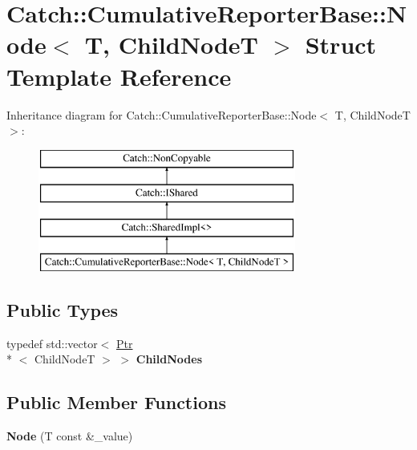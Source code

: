 \hypertarget{struct_catch_1_1_cumulative_reporter_base_1_1_node}{\section{Catch\-:\-:Cumulative\-Reporter\-Base\-:\-:Node$<$ T, Child\-Node\-T $>$ Struct Template Reference}
\label{struct_catch_1_1_cumulative_reporter_base_1_1_node}
}
Inheritance diagram for Catch\-:\-:Cumulative\-Reporter\-Base\-:\-:Node$<$ T, Child\-Node\-T $>$\-:\begin{figure}[H]
\begin{center}
\leavevmode
\includegraphics[height=4.000000cm]{struct_catch_1_1_cumulative_reporter_base_1_1_node}
\end{center}
\end{figure}
\subsection*{Public Types}
\begin{DoxyCompactItemize}
\item 
\hypertarget{struct_catch_1_1_cumulative_reporter_base_1_1_node_ad410701d72466c05acf86956aabafaf1}{typedef std\-::vector$<$ \hyperlink{class_catch_1_1_ptr}{Ptr}\\*
$<$ Child\-Node\-T $>$ $>$ {\bfseries Child\-Nodes}}\label{struct_catch_1_1_cumulative_reporter_base_1_1_node_ad410701d72466c05acf86956aabafaf1}

\end{DoxyCompactItemize}
\subsection*{Public Member Functions}
\begin{DoxyCompactItemize}
\item 
\hypertarget{struct_catch_1_1_cumulative_reporter_base_1_1_node_afff50af7c9f08e9fef089baa7c948096}{{\bfseries Node} (T const \&\-\_\-value)}\label{struct_catch_1_1_cumulative_reporter_base_1_1_node_afff50af7c9f08e9fef089baa7c948096}

\end{DoxyCompactItemize}
